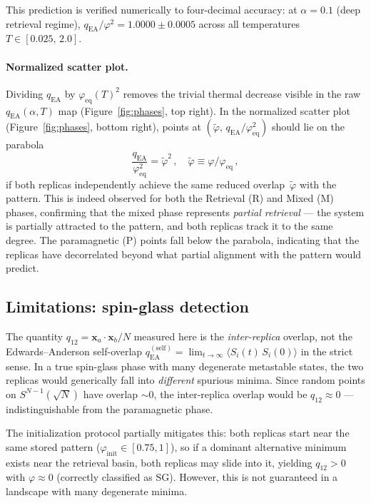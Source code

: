 \documentclass[11pt]{article}
\begin{document}
This prediction is verified numerically to four-decimal accuracy: at $\alpha = 0.1$ (deep retrieval regime), $q_{\mathrm{EA}} / \varphi^2 = 1.0000 \pm 0.0005$ across all temperatures $T \in [0.025,\, 2.0]$.

\paragraph{Normalized scatter plot.}
Dividing $q_{\mathrm{EA}}$ by $\varphi_{\mathrm{eq}}(T)^2$ removes the trivial thermal decrease visible in the raw $q_{\mathrm{EA}}(\alpha, T)$ map (Figure~\ref{fig:phases}, top right). In the normalized scatter plot (Figure~\ref{fig:phases}, bottom right), points at $(\tilde\varphi,\, q_{\mathrm{EA}}/\varphi_{\mathrm{eq}}^2)$ should lie on the parabola
\begin{equation}\label{eq:parabolic-law}
    \frac{q_{\mathrm{EA}}}{\varphi_{\mathrm{eq}}^2} = \tilde\varphi^2\,,\quad
    \tilde\varphi \equiv \varphi / \varphi_{\mathrm{eq}}\,,
\end{equation}
if both replicas independently achieve the same reduced overlap~$\tilde\varphi$ with the pattern. This is indeed observed for both the Retrieval (R) and Mixed (M) phases, confirming that the mixed phase represents \emph{partial retrieval} --- the system is partially attracted to the pattern, and both replicas track it to the same degree. The paramagnetic (P) points fall below the parabola, indicating that the replicas have decorrelated beyond what partial alignment with the pattern would predict.

\subsection{Limitations: spin-glass detection}
\label{sec:sg-limitation}

The quantity $q_{12} = \mathbf{x}_a \!\cdot\! \mathbf{x}_b / N$ measured here is the \emph{inter-replica} overlap, not the Edwards--Anderson self-overlap $q_{\mathrm{EA}}^{\mathrm{(self)}} = \lim_{t\to\infty} \langle S_i(t)\, S_i(0) \rangle$ in the strict sense.
In a true spin-glass phase with many degenerate metastable states, the two replicas would generically fall into \emph{different} spurious minima. Since random points on $S^{N-1}(\sqrt{N})$ have overlap $\sim 0$, the inter-replica overlap would be $q_{12} \approx 0$ --- indistinguishable from the paramagnetic phase.

The initialization protocol partially mitigates this: both replicas start near the same stored pattern ($\varphi_{\mathrm{init}} \in [0.75, 1]$), so if a dominant alternative minimum exists near the retrieval basin, both replicas may slide into it, yielding $q_{12} > 0$ with $\varphi \approx 0$ (correctly classified as SG). However, this is not guaranteed in a landscape with many degenerate minima.
\end{document}
